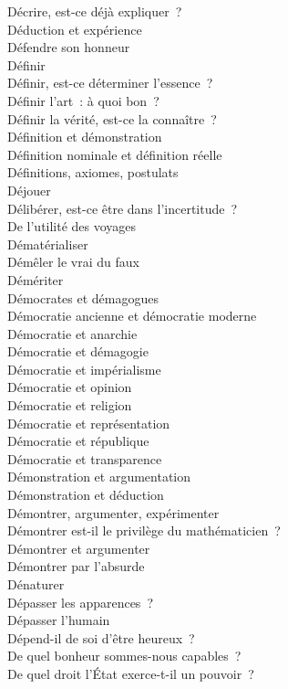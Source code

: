\documentclass[a4paper,12pt]{article}
\begin{document}
Décrire, est-ce déjà expliquer ? \\
Déduction et expérience \\
Défendre son honneur \\
Définir \\
Définir, est-ce déterminer l'essence ? \\
Définir l'art : à quoi bon ? \\
Définir la vérité, est-ce la connaître ? \\
Définition et démonstration \\
Définition nominale et définition réelle \\
Définitions, axiomes, postulats \\
Déjouer \\
Délibérer, est-ce être dans l'incertitude ? \\
De l'utilité des voyages \\
Dématérialiser \\
Démêler le vrai du faux \\
Démériter \\
Démocrates et démagogues \\
Démocratie ancienne et démocratie moderne \\
Démocratie et anarchie \\
Démocratie et démagogie \\
Démocratie et impérialisme \\
Démocratie et opinion \\
Démocratie et religion \\
Démocratie et représentation \\
Démocratie et république \\
Démocratie et transparence \\
Démonstration et argumentation \\
Démonstration et déduction \\
Démontrer, argumenter, expérimenter \\
Démontrer est-il le privilège du mathématicien ? \\
Démontrer et argumenter \\
Démontrer par l'absurde \\
Dénaturer \\
Dépasser les apparences ? \\
Dépasser l'humain \\
Dépend-il de soi d'être heureux ? \\
De quel bonheur sommes-nous capables ? \\
De quel droit l'État exerce-t-il un pouvoir ? \\
\end{document}
